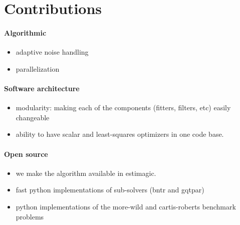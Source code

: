 \section{Contributions}
\paragraph{Algorithmic}
\begin{itemize}
    \item adaptive noise handling
    \item parallelization
\end{itemize}
\paragraph{Software architecture}
\begin{itemize}
    \item modularity: making each of the components (fitters, filters, etc) easily changeable
    \item ability to have scalar and least-squares optimizers in one code base.
\end{itemize}
\paragraph{Open source}
\begin{itemize}
    \item we make the algorithm available in estimagic.
    \item fast python implementations of sub-solvers (bntr and gqtpar)
    \item python implementations of the  more-wild and cartis-roberts benchmark problems
\end{itemize}
